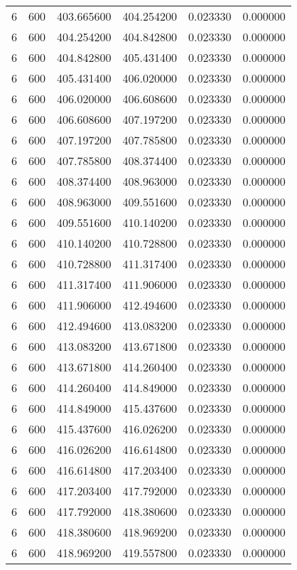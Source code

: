 \begin{longtable}{rrrrrr}
6 & 600 & 403.665600 & 404.254200 & 0.023330 & 0.000000 \\
6 & 600 & 404.254200 & 404.842800 & 0.023330 & 0.000000 \\
6 & 600 & 404.842800 & 405.431400 & 0.023330 & 0.000000 \\
6 & 600 & 405.431400 & 406.020000 & 0.023330 & 0.000000 \\
6 & 600 & 406.020000 & 406.608600 & 0.023330 & 0.000000 \\
6 & 600 & 406.608600 & 407.197200 & 0.023330 & 0.000000 \\
6 & 600 & 407.197200 & 407.785800 & 0.023330 & 0.000000 \\
6 & 600 & 407.785800 & 408.374400 & 0.023330 & 0.000000 \\
6 & 600 & 408.374400 & 408.963000 & 0.023330 & 0.000000 \\
6 & 600 & 408.963000 & 409.551600 & 0.023330 & 0.000000 \\
6 & 600 & 409.551600 & 410.140200 & 0.023330 & 0.000000 \\
6 & 600 & 410.140200 & 410.728800 & 0.023330 & 0.000000 \\
6 & 600 & 410.728800 & 411.317400 & 0.023330 & 0.000000 \\
6 & 600 & 411.317400 & 411.906000 & 0.023330 & 0.000000 \\
6 & 600 & 411.906000 & 412.494600 & 0.023330 & 0.000000 \\
6 & 600 & 412.494600 & 413.083200 & 0.023330 & 0.000000 \\
6 & 600 & 413.083200 & 413.671800 & 0.023330 & 0.000000 \\
6 & 600 & 413.671800 & 414.260400 & 0.023330 & 0.000000 \\
6 & 600 & 414.260400 & 414.849000 & 0.023330 & 0.000000 \\
6 & 600 & 414.849000 & 415.437600 & 0.023330 & 0.000000 \\
6 & 600 & 415.437600 & 416.026200 & 0.023330 & 0.000000 \\
6 & 600 & 416.026200 & 416.614800 & 0.023330 & 0.000000 \\
6 & 600 & 416.614800 & 417.203400 & 0.023330 & 0.000000 \\
6 & 600 & 417.203400 & 417.792000 & 0.023330 & 0.000000 \\
6 & 600 & 417.792000 & 418.380600 & 0.023330 & 0.000000 \\
6 & 600 & 418.380600 & 418.969200 & 0.023330 & 0.000000 \\
6 & 600 & 418.969200 & 419.557800 & 0.023330 & 0.000000 \\

\end{longtable}
